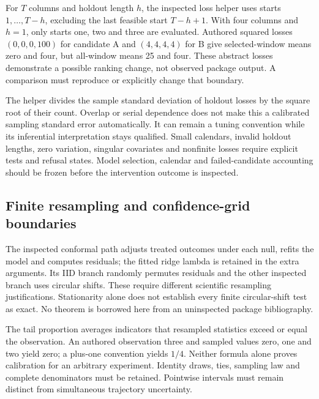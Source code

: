 For $T$ columns and holdout length $h$, the inspected loss helper uses
starts $1,\ldots,T-h$, excluding the last feasible start $T-h+1$.
With four columns and $h=1$, only starts one, two and three are evaluated.
Authored squared losses $(0,0,0,100)$ for candidate A and $(4,4,4,4)$ for B
give selected-window means zero and four, but all-window means 25 and four.
These abstract losses demonstrate a possible ranking change, not observed
package output. A comparison must reproduce or explicitly change that
boundary.\citep{exec24_augsynth_source,exec24_augsynth_choice}

The helper divides the sample standard deviation of holdout losses by the
square root of their count. Overlap or serial dependence does not make
this a calibrated sampling standard error automatically. It can remain a
tuning convention while its inferential interpretation stays qualified.
Small calendars, invalid holdout lengths, zero variation, singular
covariates and nonfinite losses require explicit tests and refusal states.
Model selection, calendar and failed-candidate accounting should be frozen
before the intervention outcome is inspected.
\citep{exec24_augsynth_source,exec24_augsynth_choice}

\subsection{Finite resampling and confidence-grid boundaries}
The inspected conformal path adjusts treated outcomes under each null,
refits the model and computes residuals; the fitted ridge lambda is retained
in the extra arguments. Its IID branch randomly permutes residuals and the
other inspected branch uses circular shifts. These require different
scientific resampling justifications. Stationarity alone does not establish
every finite circular-shift test as exact. No theorem is borrowed here from
an uninspected package bibliography.
\citep{exec24_augsynth_source,exec24_augsynth_choice}

The tail proportion averages indicators that resampled statistics exceed
or equal the observation. An authored observation three and sampled values
zero, one and two yield zero; a plus-one convention yields $1/4$. Neither
formula alone proves calibration for an arbitrary experiment. Identity draws,
ties, sampling law and complete denominators must be retained. Pointwise
intervals must remain distinct from simultaneous trajectory uncertainty.
\citep{exec24_augsynth_source,exec24_augsynth_choice}

